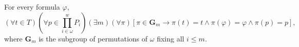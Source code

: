 For every formula $\varphi$,
$$(\forall t \in T) \left( \forall p \in \prod_{i \in \omega}^{w} P_i \right) (\exists m) (\forall \pi) [\pi \in \mathbf{G}_m \rightarrow \pi(t) = t \land \pi(\varphi) = \varphi \land \pi(p) = p],$$
where $\mathbf{G}_m$ is the subgroup of permutations of $\omega$ fixing all $i \leq m$.

